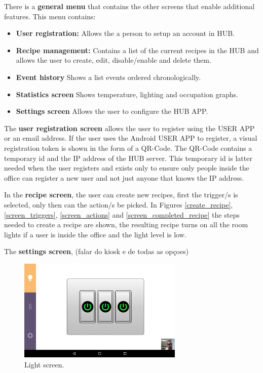 There is a \textbf{general menu} that contains the other screens that enable additional features. This menu contains:
\begin{itemize}
  \item \textbf{User registration:} Allows the a person to setup an account in HUB. 
  \item \textbf{Recipe management:} Contains a list of the current recipes in the HUB and allows the user to create, edit, disable/enable and delete them.
  
  \item \textbf{Event history} Shows a list events ordered chronologically. 
  
  \item \textbf{Statistics screen} Shows temperature, lighting and occupation graphs. 
  
  \item \textbf{Settings screen} Allows the user to configure the HUB APP.
\end{itemize}



The \textbf{user registration screen} allows the user to register using the USER APP or an email address.
If the user uses the Android USER APP to register, a visual registration token is shown in the form of a QR-Code. The QR-Code contains a temporary id and the IP address of the HUB server. This temporary id is latter needed when the user registers and exists  only to ensure only people inside the office can register a new user and not just anyone that knows the IP address.

In the \textbf{recipe screen}, the user can create new recipes, first the trigger/s is selected, only then can the action/s be picked. In Figures \ref{create_recipe}, \ref{screen_triggers}, \ref{screen_actions} and \ref{screen_completed_recipe} the steps needed to create a recipe are shown, the resulting recipe turns on all the room lights if a user is inside the office and the light level is low. 

The \textbf{settings screen}, (falar do kiosk e de todas as opçoes)





\begin{figure}[h]
\centering
\includegraphics[width=0.7\textwidth]{Figures/screen_lights}
\caption{Light screen.}
\label{screen_lights}
\end{figure}


